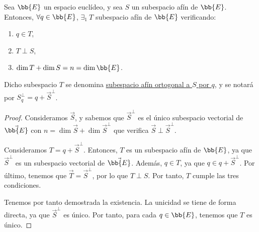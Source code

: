 \begin{teo}
    Sea $\bb{E}$ un espacio euclídeo, y sea $S$ un subespacio afín de $\bb{E}$. Entonces, $\forall q\in \bb{E}$, $\exists_1~ T$ subespacio afín de $\bb{E}$ verificando:
    \begin{enumerate}
        \item $q\in T$,
        \item $T\perp S$,
        \item $\dim T + \dim S = n=\dim \bb{E}$.
    \end{enumerate}
    Dicho subespacio $T$ se denomina \ul{subespacio afín ortogonal a $S$ por $q$}, y se notará por $S_q^\perp=q+\vec{S}^\perp$.
\end{teo}
\begin{proof}
    Consideramos $\vec{S}$, y sabemos que $\vec{S}^\perp$ es el único subespacio vectorial de $\vec{\bb{E}}$
    con $n=\dim \vec{S}+\dim \vec{S}^\perp$ que verifica $\vec{S}\perp \vec{S}^\perp$.

    Consideramos $T=q+\vec{S}^\perp$. Entonces, $T$ es un subespacio afín de $\bb{E}$, ya que $\vec{S}^\perp$ es un subespacio vectorial de $\vec{\bb{E}}$.
    Además, $q\in T$, ya que $q\in q+\vec{S}^\perp$. Por último, tenemos que $\vec{T}=\vec{S}^\perp$, por lo que $T\perp S$. Por tanto, $T$ cumple las tres condiciones.
    
    Tenemos por tanto demostrada la existencia. La unicidad se tiene de forma directa, ya que $\vec{S}^\perp$ es único. Por tanto, para cada $q\in \bb{E}$, tenemos que $T$ es único.
\end{proof}

